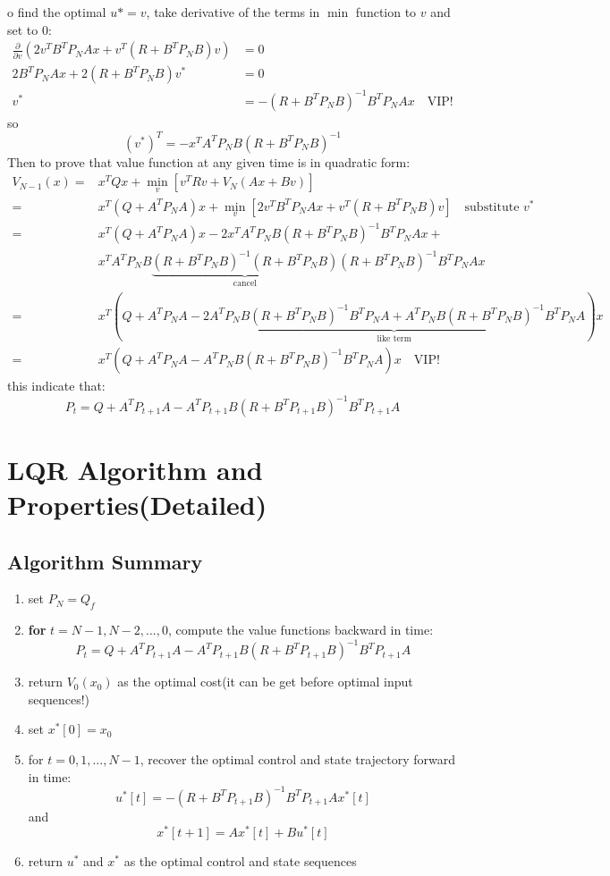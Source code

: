 \documentclass[10pt,a4paper,oneside]{article}
\begin{document}
o find the optimal $u*=v$, take derivative of the terms in $\min$ function to $v$ and set to $0$:
\begin{align*}
\frac{\partial}{\partial v} \left(2v^TB^TP_NAx + v^T (R + B^TP_NB)v\right) &= 0\\
2 B^TP_NAx + 2 (R + B^TP_NB)v^*  &=0\\
v^* &=  -(R + B^TP_NB)^{-1}B^TP_NAx \quad \text{VIP!}
\end{align*}
so
\[
(v^*)^T = -x^T A^T P_N B (R + B^TP_NB)^{-1}
\]
Then to prove that value function at any given time is in quadratic form:
\begin{align*}
V_{N-1}(x) =& x^T Q x + \min_{v}[v^T R v+V_N(Ax+Bv)]\\
=& x^T(Q+A^TP_NA)x + \min_{v}[2v^TB^TP_NAx + v^T (R + B^TP_NB)v] \quad \text{substitute }v^*\\
=& x^T(Q+A^TP_NA)x - 2x^T A^T P_N B (R + B^TP_NB)^{-1} B^TP_NAx + \\
&x^T A^T P_N B \underbrace{(R + B^TP_NB)^{-1}(R + B^TP_NB)}_{\text{cancel}}(R + B^TP_NB)^{-1}B^TP_NAx\\
=& x^T \left(Q+A^TP_NA - \underbrace{2A^T P_N B (R + B^TP_NB)^{-1} B^TP_NA+  A^T P_N B(R + B^TP_NB)^{-1}B^TP_NA}_{\text{like term}}\right) x\\
=&x^T \left(Q+A^TP_NA - A^T P_N B (R + B^TP_NB)^{-1} B^TP_NA  \right) x \quad \text{VIP!}
\end{align*}
this indicate that:
\[
P_t=Q+A^T P_{t+1} A - A^T P_{t+1} B (R+B^TP_{t+1}B)^{-1} B^T P_{t+1} A
\]


\section{LQR Algorithm and Properties(Detailed)}

\subsection{Algorithm Summary}

\begin{enumerate}
	\item set $P_N=Q_f$
	\item \textbf{for} $t=N-1,N-2,...,0$, compute the value functions backward in time:
	\[
	P_t=Q+A^T P_{t+1} A - A^T P_{t+1} B (R+B^TP_{t+1}B)^{-1} B^T P_{t+1} A
	\]
	\item return $V_0(x_0)$ as the optimal cost(it can be get before optimal input sequences!)
	\item set $x^*[0]=x_0$
	\item for $t=0,1,...,N-1$, recover the optimal control and state trajectory forward in time:
	\[
	u^*[t]=-(R+B^TP_{t+1}B)^{-1}B^TP_{t+1}Ax^*[t]
	\]
	and
	\[
	x^*[t+1]=Ax^*[t]+Bu^*[t]
	\]
	\item return $u^*$ and $x^*$ as the optimal control and state sequences
\end{enumerate}
\end{document}

